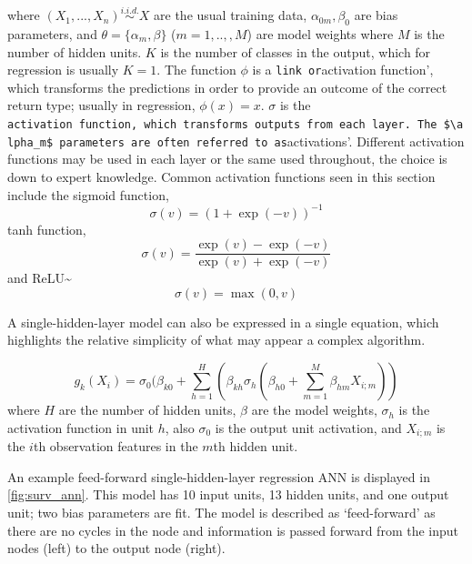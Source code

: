 \documentclass[
  letterpaper,
]{scrbook}
\theoremstyle{plain}
\theoremstyle{definition}
\theoremstyle{remark}
\begin{document}
where \((X_1,...,X_n) \stackrel{i.i.d.}\sim X\) are the usual training
data, \(\alpha_{0m}, \beta_0\) are bias parameters, and
\(\theta = \{\alpha_m, \beta\}\) (\(m = 1,..,,M\)) are model weights
where \(M\) is the number of hidden units. \(K\) is the number of
classes in the output, which for regression is usually \(K = 1\). The
function \(\phi\) is a \texttt{link\textquotesingle{}\ or}activation
function', which transforms the predictions in order to provide an
outcome of the correct return type; usually in regression,
\(\phi(x) = x\). \(\sigma\) is the
\texttt{activation\ function\textquotesingle{},\ which\ transforms\ outputs\ from\ each\ layer.\ The\ \$\textbackslash{}alpha\_m\$\ parameters\ are\ often\ referred\ to\ as}activations'.
Different activation functions may be used in each layer or the same
used throughout, the choice is down to expert knowledge. Common
activation functions seen in this section include the sigmoid function,
\[
\sigma(v) = (1 + \exp(-v))^{-1}
\] tanh function, \[
\sigma(v) = \frac{\exp(v) - \exp(-v)}{\exp(v) + \exp(-v)}
\label{eq:surv_tanh}
\] and ReLU\textasciitilde{}\cite{Nair2010} \[
\sigma(v) = \max(0, v)
\label{eq:surv_relu}
\]

A single-hidden-layer model can also be expressed in a single equation,
which highlights the relative simplicity of what may appear a complex
algorithm.

\[
g_k(X_i) = \sigma_0(\beta_{k0} + \sum_{h=1}^H (\beta_{kh}\sigma_h (\beta_{h0} + \sum^M_{m=1} \beta_{hm}X_{i;m}))
\label{eq:surv_nnet}
\] where \(H\) are the number of hidden units, \(\beta\) are the model
weights, \(\sigma_h\) is the activation function in unit \(h\), also
\(\sigma_0\) is the output unit activation, and \(X_{i;m}\) is the
\(i\)th observation features in the \(m\)th hidden unit.

An example feed-forward single-hidden-layer regression ANN is displayed
in \ref{fig:surv_ann}. This model has 10 input units, 13 hidden units,
and one output unit; two bias parameters are fit. The model is described
as `feed-forward' as there are no cycles in the node and information is
passed forward from the input nodes (left) to the output node (right).
\end{document}
